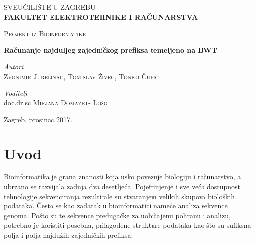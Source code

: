 \documentclass[a4paper,12pt]{article}
\begin{document}
\begin{titlepage}
	\center
	
	\textsc{\Large SVEUČILIŠTE U ZAGREBU}\\
	\vspace{0.4cm}
	\textsc{\Large \textbf{FAKULTET ELEKTROTEHNIKE I RAČUNARSTVA}}
	\vspace{2.5cm}
	\vfill\vfill
    
	\textsc{\Large Projekt iz Bioinformatike}
	\vspace{0.5cm}
	
	{\huge\bfseries Računanje najduljeg zajedničkog prefiksa temeljeno na BWT}
	\vspace{1.2cm}
	
	\begin{minipage}{2.5\textwidth}
		\begin{flushleft}
			\large
			\textit{Autori}\\
			\textsc{Zvonimir Jurelinac, Tomislav Živec, Tonko Čupić}
		\end{flushleft}
	\end{minipage}

	\vspace{0.3cm}

	\begin{minipage}{2.5\textwidth}
		\begin{flushleft}
			\large
			\textit{Voditelj}\\
			doc.dr.sc \textsc{Mirjana Domazet- Lošo}
		\end{flushleft}
	\end{minipage}
	
	\vfill\vfill\vfill\vfill
	{\large Zagreb, prosinac 2017.}
		
\end{titlepage}

\newpage

\tableofcontents
\newpage

\section{Uvod}

Bioinformatika je grana znanosti koja usko povezuje biologiju i računarstvo, a ubrzano se razvijala zadnja dva desetljeća. Pojeftinjenje i sve veća dostupnost tehnologije sekvenciranja rezultirale su stvaranjem velikih skupova bioloških podataka. Često se kao zadatak u bioinformatici nameće analiza sekvence genoma. Pošto su te sekvence predugačke za uobičajenu pohranu i analizu, potrebno je koristiti posebna, prilagođene strukture podataka kao što su sufiksna polja i polja najdužih zajedničkih prefiksa. 
\end{document}
